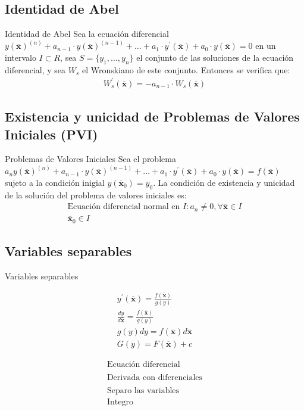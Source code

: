 \documentclass[a4paper, twoside]{article}
\numberwithin{equation}{section}
\numberwithin{figure}{section}
\numberwithin{table}{section}
\newcommand{\vect}[1]{\overline{\textbf{#1}}}
\begin{document}
\subsection{Identidad de Abel}
\begin{teorema*}{Identidad de Abel}
	Sea la ecuación diferencial $y(\vect{x})^{(n)} + a_{n-1} \cdot y(\vect{x})^{(n-1)} + \ldots + a_1 \cdot y^\prime(\vect{x}) + a_0 \cdot y(\vect{x}) = 0$ en un intervalo $I \subset R$, sea $S=\{y_1, \ldots, y_n \}$ el conjunto de las soluciones de la ecuación diferencial, y sea $W_s$ el Wronskiano de este conjunto. Entonces se verifica que:
	\begin{align}
		W^\prime_s(\vect{x})=-a_{n-1} \cdot W_s(\vect{x})
	\end{align}
\end{teorema*}

\subsection{Existencia y unicidad de Problemas de Valores Iniciales (PVI)}
\begin{definicion*}{Problemas de Valores Iniciales}
	Sea el problema $a_ny(\vect{x})^{(n)} + a_{n-1} \cdot y(\vect{x})^{(n-1)} + \ldots + a_1 \cdot y^\prime(\vect{x}) + a_0 \cdot y(\vect{x}) = f(\vect{x})$ sujeto a la condición inigial $y(\vect{x}_0) = y_0$. La condición de existencia y unicidad de la solución del problema de valores iniciales es:
	\begin{align}
		\text{Ecuación diferencial normal en } I:a_n \neq 0, \forall \vect{x} \in I \\
		\vect{x}_0 \in I
	\end{align}
\end{definicion*}

\subsection{Variables separables}
\begin{definicion*}{Variables separables}
	\begin{minipage}{0.50\textwidth}
		\begin{align*}
			y^\prime(\vect{x})=\frac{f(\vect{x})}{g(y)} \\
			\frac{dy}{d\vect{x}}=\frac{f(\vect{x})}{g(y)} \\
			g(y) dy =f(\vect{x}) d\vect{x} \\
			G(y)=F(\vect{x})+c
		\end{align*}
	\end{minipage}
	\begin{minipage}{0.30\textwidth}
		\begin{align*}
			\text{Ecuación diferencial} \\
			\text{ } \\
			\text{Derivada con diferenciales} \\
			\text{ } \\
			\text{Separo las variables} \\
			\text{Integro}
		\end{align*}
	\end{minipage}
\end{definicion*}
\end{document}
